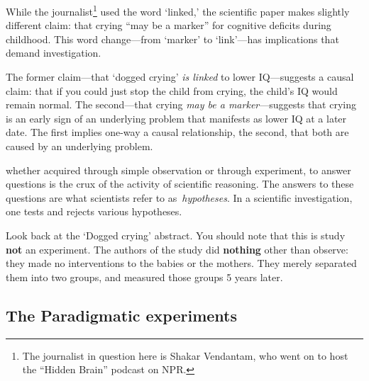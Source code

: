 \begin{refsection}
While the journalist\footnote{The journalist in question here is Shakar Vendantam, who went on to host the ``Hidden Brain'' podcast on NPR.} used the word `linked,' the scientific paper makes slightly different claim: that crying ``may be a marker'' for cognitive deficits during childhood. This word change---from `marker' to `link'---has implications that demand investigation.

The former claim---that `dogged crying' \emph{is linked} to lower IQ---suggests a causal claim: that if you could just stop the child from crying, the child's IQ would remain normal. The second---that crying \emph{may be a marker}---suggests that crying is an early sign of an underlying problem that manifests as lower IQ at a later date. The first implies one-way a causal relationship, the second, that both are caused by an underlying problem.

 whether acquired through simple observation or through experiment, to answer questions is the crux of the activity of scientific reasoning. The answers to these questions are what scientists refer to as \emph{hypotheses}. In a scientific investigation, one tests and rejects various hypotheses. 

Look back at the `Dogged crying' abstract. You should note that this is study \textbf{not} an experiment. The authors of the study did \textbf{nothing} other than observe: they made no interventions to the babies or the mothers. They merely separated them into two groups, and measured those groups 5 years later. 

\subsection{The Paradigmatic experiments}
\label{theparadigmaticexperiments}


\end{refsection}
